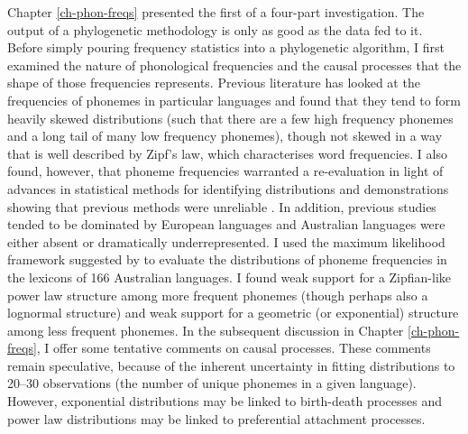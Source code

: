Chapter \ref{ch-phon-freqs} presented the first of a four-part investigation. The output of a phylogenetic methodology is only as good as the data fed to it. Before simply pouring frequency statistics into a phylogenetic algorithm, I first examined the nature of phonological frequencies and the causal processes that the shape of those frequencies represents. Previous literature has looked at the frequencies of phonemes in particular languages and found that they tend to form heavily skewed distributions (such that there are a few high frequency phonemes and a long tail of many low frequency phonemes), though not skewed in a way that is well described by Zipf's law, which characterises word frequencies. I also found, however, that phoneme frequencies warranted a re-evaluation in light of advances in statistical methods for identifying distributions and demonstrations showing that previous methods were unreliable \autocite{clauset_power-law_2009}. In addition, previous studies tended to be dominated by European languages and Australian languages were either absent or dramatically underrepresented. I used the maximum likelihood framework suggested by \textcite{clauset_power-law_2009} to evaluate the distributions of phoneme frequencies in the lexicons of 166 Australian languages. I found weak support for a Zipfian-like power law structure among more frequent phonemes (though perhaps also a lognormal structure) and weak support for a geometric (or exponential) structure among less frequent phonemes. In the subsequent discussion in Chapter \ref{ch-phon-freqs}, I offer some tentative comments on causal processes. These comments remain speculative, because of the inherent uncertainty in fitting distributions to 20--30 observations (the number of unique phonemes in a given language). However, exponential distributions may be linked to birth-death processes and power law distributions may be linked to preferential attachment processes.

